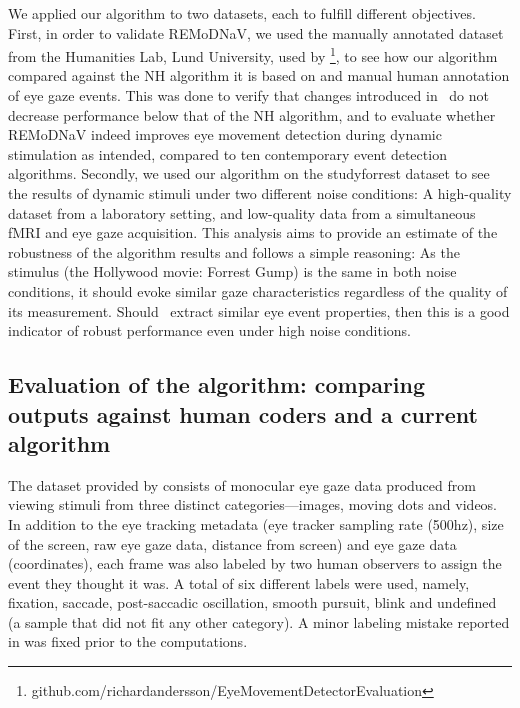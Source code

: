 We applied our algorithm to two datasets, each to fulfill different objectives.
First, in order to validate REMoDNaV, we used the manually annotated dataset
from the Humanities Lab, Lund University, used by
\cite{Andersson2017}\footnote{github.com/richardandersson/EyeMovementDetector\linebreak[0]Evaluation},
to see how our algorithm compared against the NH algorithm it is based on and
manual human annotation of eye gaze events. This was done to verify that
changes introduced in \remodnav\ do not decrease performance below that of the
NH algorithm, and to evaluate whether REMoDNaV indeed improves eye movement
detection during dynamic stimulation as intended, compared to ten contemporary
event detection algorithms. Secondly, we used our algorithm on the studyforrest
dataset \citep{Hanke2016} to see the results of dynamic stimuli under two
different noise conditions: A high-quality dataset from a laboratory setting,
and low-quality data from a simultaneous fMRI and eye gaze acquisition.  This
analysis aims to provide an estimate of the robustness of the algorithm results
and follows a simple reasoning: As the stimulus (the Hollywood movie: Forrest
Gump) is the same in both noise conditions, it should evoke similar gaze
characteristics regardless of the quality of its measurement. Should \remodnav\
extract similar eye event properties, then this is a good indicator of robust
performance even under high noise conditions.

\subsection*{Evaluation of the algorithm: comparing outputs against human
coders and a current algorithm}\label{ana_1}

The dataset provided by \cite{Andersson2017} consists of monocular eye gaze
data produced from viewing stimuli from three distinct categories---images,
moving dots and videos. In addition to the eye tracking metadata (eye tracker
sampling rate (500hz), size of the screen, raw eye gaze data, distance from
screen) and eye gaze data (coordinates), each frame was also labeled by two
human observers to assign the event they thought it was. A total of six
different labels were used, namely, fixation, saccade, post-saccadic
oscillation, smooth pursuit, blink and undefined (a sample that did not fit any
other category). A minor labeling mistake reported in \cite{Zemblys2018} was
fixed prior to the computations.

